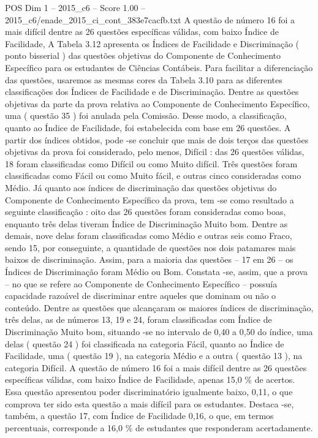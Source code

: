 \begin{textsample}{POS Dim 1 – 2015\_c6 – Score 1.00 – 2015\_c6/enade\_2015\_ci\_cont\_383e7cacfb.txt}
A questão de número 16 foi a mais difícil dentre as 26 questões específicas válidas, com baixo Índice de Facilidade, A Tabela 3.12 apresenta os Índices de Facilidade e Discriminação ( ponto bisserial ) das questões objetivas do Componente de Conhecimento Específico para os estudantes de Ciências Contábeis.
Para facilitar a diferenciação das questões, usaremos as mesmas cores da Tabela 3.10 para as diferentes classificações dos Índices de Facilidade e de Discriminação.
Dentre as questões objetivas da parte da prova relativa ao Componente de Conhecimento Específico, uma ( questão 35 ) foi anulada pela Comissão.
Desse modo, a classificação, quanto ao Índice de Facilidade, foi estabelecida com base em 26 questões.
A partir dos índices obtidos, pode -se concluir que mais de dois terços das questões objetivas da prova foi considerado, pelo menos, Difícil : das 26 questões válidas, 18 foram classificadas como Difícil ou como Muito difícil.
Três questões foram classificadas como Fácil ou como Muito fácil, e outras cinco consideradas como Médio.
Já quanto aos índices de discriminação das questões objetivas do Componente de Conhecimento Específico da prova, tem -se como resultado a seguinte classificação : oito das 26 questões foram consideradas como boas, enquanto três delas tiveram Índice de Discriminação Muito bom.
Dentre as demais, nove delas foram classificadas como Médio e outras seis como Fraco, sendo 15, por conseguinte, a quantidade de questões nos dois patamares mais baixos de discriminação.
Assim, para a maioria das questões – 17 em 26 – os Índices de Discriminação foram Médio ou Bom.
Constata -se, assim, que a prova – no que se refere ao Componente de Conhecimento Específico – possuía capacidade razoável de discriminar entre aqueles que dominam ou não o conteúdo.
Dentre as questões que alcançaram os maiores índices de discriminação, três delas, as de números 13, 19 e 24, foram classificadas com Índice de Discriminação Muito bom, situando -se no intervalo de 0,40 a 0,50 do índice, uma delas ( questão 24 ) foi classificada na categoria Fácil, quanto ao Índice de Facilidade, uma ( questão 19 ), na categoria Médio e a outra ( questão 13 ), na categoria Difícil.
A questão de número 16 foi a mais difícil dentre as 26 questões específicas válidas, com baixo Índice de Facilidade, apenas 15,0 \% de acertos.
Essa questão apresentou poder discriminatório igualmente baixo, 0,11, o que comprova ter sido esta questão a mais difícil para os estudantes.
Destaca -se, também, a questão 17, com Índice de Facilidade 0,16, o que, em termos percentuais, corresponde a 16,0 \% de estudantes que responderam acertadamente.

\end{textsample}
